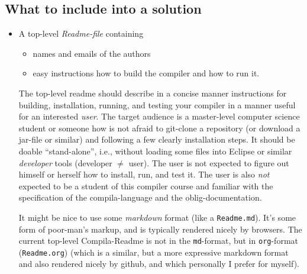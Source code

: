 \documentclass[10pt,freeform]{handout}[2014/08/13]
\begin{document}
\subsection{What to include into a solution}
\label{sec:what-include-into}


\begin{itemize}
\item A top-level \emph{Readme-file} containing
  \begin{itemize}
  \item names and emails of the authors
  \item easy instructions how to build the compiler and how to run it.
  \end{itemize}
  The top-level readme should describe in a concise manner instructions for
  building, installation, running, and testing your compiler in a manner
  useful for an interested \emph{user}. The target audience is a
  master-level computer science student or someone how is not afraid to
  git-clone a repository (or download a jar-file or similar) and following
  a few clearly installation steps. It should be doable ``stand-alone'',
  i.e., without loading some files into Eclipse or similar \emph{developer}
  tools (developer $\not=$ user). The user is not expected to figure out
  himself or herself how to install, run, and test it. The user is also
  \emph{not} expected to be a student of this compiler course and familiar
  with the specification of the compila-language and the
  oblig-documentation.

  It might be nice to use some \emph{markdown} format (like a
  \texttt{Readme.md}). It's some form of poor-man's markup, and is
  typically rendered nicely by browsers. The current top-level
  Compila-Readme is not in the \texttt{md}-format, but in
  \texttt{org}-format (\texttt{Readme.org}) (which is a similar, but a more
  expressive markdown format and also rendered nicely by github, and which
  personally I prefer for myself).
  

\end{itemize}
\end{document}
